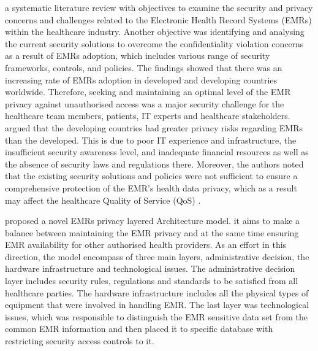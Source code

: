 \citet{Mahfuth2016}a systematic literature review with objectives to examine the security and privacy concerns and challenges related to the Electronic Health Record Systems (EMRs) within the healthcare industry. Another objective was identifying and analysing the current security solutions to overcome the confidentiality violation concerns as a result of  EMRs adoption, which includes various range of security frameworks, controls, and policies. The findings showed that there was an increasing rate of EMRs adoption in developed and developing countries worldwide. Therefore, seeking and maintaining an optimal level of the EMR privacy against unauthorised access was a major security challenge for the healthcare team members, patients, IT experts and healthcare stakeholders. \citet{Mahfuth2016} argued that the developing countries had greater privacy risks regarding EMRs than the developed. This is due to poor IT experience and  infrastructure, the insufficient  security awareness level, and inadequate financial resources as well as the absence of security laws and regulations there. Moreover, the authors noted that the existing security solutions and policies were not sufficient to ensure a comprehensive protection of the EMR's health data privacy, which as a result may affect the healthcare Quality of Service (QoS) \cite{Mahfuth2016}.

\citet{bensefia2014proposed} proposed a novel EMRs privacy layered Architecture model. it aims to make a balance between maintaining the EMR privacy and at the same time ensuring EMR availability for other authorised health providers. As an effort in this direction, the  \cite{bensefia2014proposed} model encompass of three main layers, administrative decision, the hardware infrastructure and technological issues. The administrative decision layer includes security rules, regulations and standards to be satisfied from all healthcare parties. The hardware infrastructure includes all the physical types of equipment that were involved in handling EMR. The last layer was technological issues, which was responsible to distinguish the EMR sensitive data set from the common EMR information and then placed it to specific database with restricting security access controls to it.
